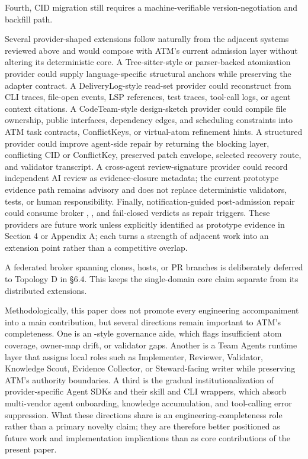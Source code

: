 \documentclass[9pt,letterpaper]{extarticle}
\begin{document}
Fourth, CID migration still requires a machine-verifiable version-negotiation and backfill path.

Several provider-shaped extensions follow naturally from the adjacent systems reviewed above and would compose with ATM's current admission layer without altering its deterministic core. A Tree-sitter-style or parser-backed atomization provider could supply language-specific structural anchors while preserving the adapter contract. A DeliveryLog-style read-set provider could reconstruct \texttt{} from CLI traces, file-open events, LSP references, test traces, tool-call logs, or agent context citations. A CodeTeam-style design-sketch provider could compile file ownership, public interfaces, dependency edges, and scheduling constraints into ATM task contracts, ConflictKeys, or virtual-atom refinement hints. A structured \texttt{} provider could improve agent-side repair by returning the blocking layer, conflicting CID or ConflictKey, preserved patch envelope, selected recovery route, and validator transcript. A cross-agent review-signature provider could record independent AI review as evidence-closure metadata; the current prototype evidence path remains advisory and does not replace deterministic validators, tests, or human responsibility. Finally, notification-guided post-admission repair could consume broker \texttt{}, \texttt{}, and fail-closed verdicts as repair triggers. These providers are future work unless explicitly identified as prototype evidence in Section 4 or Appendix A; each turns a strength of adjacent work into an extension point rather than a competitive overlap.

A federated broker spanning clones, hosts, or PR branches is deliberately deferred to Topology D in §6.4. This keeps the single-domain core claim separate from its distributed extensions.

Methodologically, this paper does not promote every engineering accompaniment into a main contribution, but several directions remain important to ATM's completeness. One is an \texttt{}-style governance aide, which flags insufficient atom coverage, owner-map drift, or validator gaps. Another is a Team Agents runtime layer that assigns local roles such as Implementer, Reviewer, Validator, Knowledge Scout, Evidence Collector, or Steward-facing writer while preserving ATM's authority boundaries. A third is the gradual institutionalization of provider-specific Agent SDKs and their skill and CLI wrappers, which absorb multi-vendor agent onboarding, knowledge accumulation, and tool-calling error suppression. What these directions share is an engineering-completeness role rather than a primary novelty claim; they are therefore better positioned as future work and implementation implications than as core contributions of the present paper.
\end{document}
